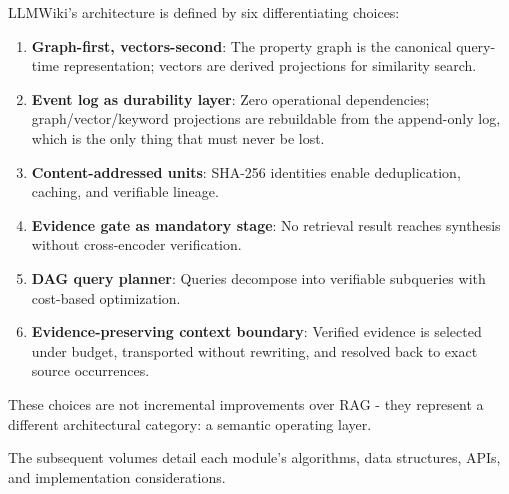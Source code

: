 LLMWiki's architecture is defined by six differentiating choices:
\begin{enumerate}
  \item \textbf{Graph-first, vectors-second}: The property graph is the canonical query-time representation; vectors are derived projections for similarity search.
  \item \textbf{Event log as durability layer}: Zero operational dependencies; graph/vector/keyword projections are rebuildable from the append-only log, which is the only thing that must never be lost.
  \item \textbf{Content-addressed units}: SHA-256 identities enable deduplication, caching, and verifiable lineage.
  \item \textbf{Evidence gate as mandatory stage}: No retrieval result reaches synthesis without cross-encoder verification.
  \item \textbf{DAG query planner}: Queries decompose into verifiable subqueries with cost-based optimization.
  \item \textbf{Evidence-preserving context boundary}: Verified evidence is selected under budget, transported without rewriting, and resolved back to exact source occurrences.
\end{enumerate}
These choices are not incremental improvements over RAG - they represent a different architectural category: a semantic operating layer.

The subsequent volumes detail each module's algorithms, data structures, APIs, and implementation considerations.

